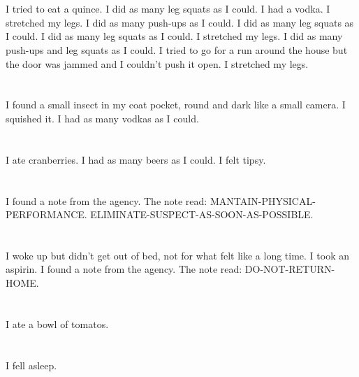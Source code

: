 \documentclass{article}
\begin{document}
    \section{}
    I tried to eat a quince. I did as many leg squats as I could. I had a vodka.  I stretched my legs.  I did as many push-ups as I could.  I did as many leg squats as I could.  I did as many leg squats as I could.   I stretched my legs.  I did as many push-ups and leg squats as I could.  I tried to go for a run around the house but the door was jammed and I couldn't push it open.  I stretched my legs.  
    \newpage
    
    \section{}
    I found a small insect in my coat pocket, round and dark like a small camera. I squished it. I had as many vodkas as I could.  
    \newpage
    
    \section{}
    I ate cranberries. I had as many beers as I could. I felt tipsy.  
    \newpage
    
    \section{}
    I found a note from the agency. The note read: MANTAIN-PHYSICAL-PERFORMANCE. ELIMINATE-SUSPECT-AS-SOON-AS-POSSIBLE.  
    \newpage
    
    \section{}
    I woke up but didn't get out of bed, not for what felt like a long time. I took an aspirin. I found a note from the agency. The note read: DO-NOT-RETURN-HOME.  
    \newpage
    
    \section{}
    I ate a bowl of tomatos.  
    \newpage
    
    \section{}
    I fell asleep.\\\\ 
    \newpage
    
\end{document}
